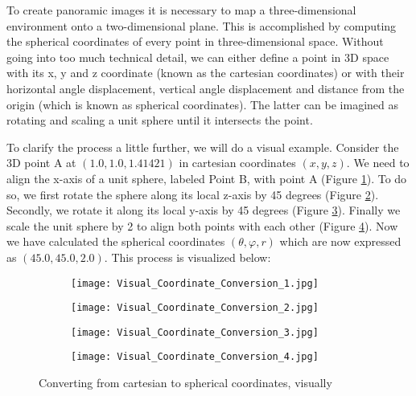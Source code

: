 To create panoramic images it is necessary to map a three-dimensional environment onto a two-dimensional plane. This is accomplished by computing the spherical coordinates of every point in three-dimensional space. Without going into too much technical detail, we can either define a point in 3D space with its x, y and z coordinate (known as the cartesian coordinates) or with their horizontal angle displacement, vertical angle displacement and distance from the origin (which is known as spherical coordinates). The latter can be imagined as rotating and scaling a unit sphere until it intersects the point.

To clarify the process a little further, we will do a visual example. Consider the 3D point A at {$(1.0, 1.0, 1.41421)$}  in cartesian coordinates {$(x, y, z)$}. We need to align the x-axis of a unit sphere, labeled Point B, with point A (Figure \ref{fig:visual_coordinate_conversion_1}). To do so, we first rotate the sphere along its local z-axis by 45 degrees (Figure \ref{fig:visual_coordinate_conversion_2}). Secondly, we rotate it along its local y-axis by 45 degrees (Figure \ref{fig:visual_coordinate_conversion_3}). Finally we scale the unit sphere by 2 to align both points with each other (Figure \ref{fig:visual_coordinate_conversion_4}). Now we have calculated the spherical coordinates {$(\theta, \varphi, r)$} which are now expressed as {$(45.0, 45.0, 2.0)$}. This process is visualized below:

\begin{figure}[h]
	\centering
	\begin{subfigure}[b]{0.24\textwidth}
		\centering
		\texttt{[image: Visual\_Coordinate\_Conversion\_1.jpg]}
		\caption{}
		\label{fig:visual_coordinate_conversion_1}
	\end{subfigure}
	\hfill
	\begin{subfigure}[b]{0.24\textwidth}
		\centering
		\texttt{[image: Visual\_Coordinate\_Conversion\_2.jpg]}
		\caption{}
		\label{fig:visual_coordinate_conversion_2}
	\end{subfigure}
	\hfill
	\begin{subfigure}[b]{0.24\textwidth}
		\centering
		\texttt{[image: Visual\_Coordinate\_Conversion\_3.jpg]}
		\caption{}
		\label{fig:visual_coordinate_conversion_3}
	\end{subfigure}
	\hfill
	\begin{subfigure}[b]{0.24\textwidth}
		\centering
		\texttt{[image: Visual\_Coordinate\_Conversion\_4.jpg]}
		\caption{}
		\label{fig:visual_coordinate_conversion_4}
	\end{subfigure}
	
	\caption{Converting from cartesian to spherical coordinates, visually}
	\label{fig:converting_cartesian_to_spherical}
\end{figure}

